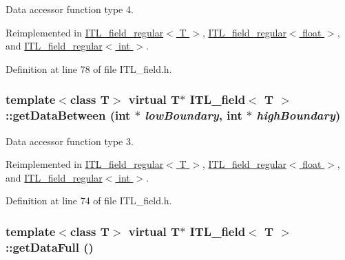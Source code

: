Data accessor function type 4. 



Reimplemented in \hyperlink{classITL__field__regular_a13a2ec8f1e67b6a906d1799a58acf9bd}{ITL\_\-field\_\-regular$<$ T $>$}, \hyperlink{classITL__field__regular_a13a2ec8f1e67b6a906d1799a58acf9bd}{ITL\_\-field\_\-regular$<$ float $>$}, and \hyperlink{classITL__field__regular_a13a2ec8f1e67b6a906d1799a58acf9bd}{ITL\_\-field\_\-regular$<$ int $>$}.



Definition at line 78 of file ITL\_\-field.h.

\hypertarget{classITL__field_ab3254f696ccca1b4ea1aae248bea989c}{
\subsubsection[{getDataBetween}]{\setlength{\rightskip}{0pt plus 5cm}template$<$class T$>$ virtual T$\ast$ {\bf ITL\_\-field}$<$ T $>$::getDataBetween (int $\ast$ {\em lowBoundary}, \/  int $\ast$ {\em highBoundary})}}
\label{classITL__field_ab3254f696ccca1b4ea1aae248bea989c}


Data accessor function type 3. 



Reimplemented in \hyperlink{classITL__field__regular_af0d8776246431db1f5069f2ce6eb4d2f}{ITL\_\-field\_\-regular$<$ T $>$}, \hyperlink{classITL__field__regular_af0d8776246431db1f5069f2ce6eb4d2f}{ITL\_\-field\_\-regular$<$ float $>$}, and \hyperlink{classITL__field__regular_af0d8776246431db1f5069f2ce6eb4d2f}{ITL\_\-field\_\-regular$<$ int $>$}.



Definition at line 74 of file ITL\_\-field.h.

\hypertarget{classITL__field_afba4c040443d3f21d3f4af30a70292be}{
\subsubsection[{getDataFull}]{\setlength{\rightskip}{0pt plus 5cm}template$<$class T$>$ virtual T$\ast$ {\bf ITL\_\-field}$<$ T $>$::getDataFull ()}}
\label{classITL__field_afba4c040443d3f21d3f4af30a70292be}


